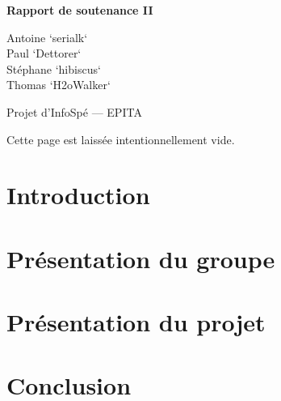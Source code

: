 \documentclass[12pt,a4paper]{article}
\newcommand{\subtitle}{Rapport de soutenance II}
\begin{document}
\begin{titlepage}
\begin{center}
\vspace{8cm}
\vspace{0.5cm}

\LARGE{\textbf{\subtitle}}
\vspace{1cm}

\large{\textsf{
Antoine `serialk`  \\
Paul `Dettorer`  \\
Stéphane `hibiscus`  \\
Thomas `H2oWalker` }}
\vspace{2cm}

\large{\textsf{Projet d'InfoSpé --- EPITA}}
\end{center}
\end{titlepage}

\newpage
Cette page est laissée intentionnellement vide.

\newpage
\setcounter{tocdepth}{3}
\tableofcontents

\newpage
\pagestyle{headings}
\section{Introduction}

\section{Présentation du groupe}


\newpage
\section{Présentation du projet}


\newpage
\section{Conclusion}

\end{document}
